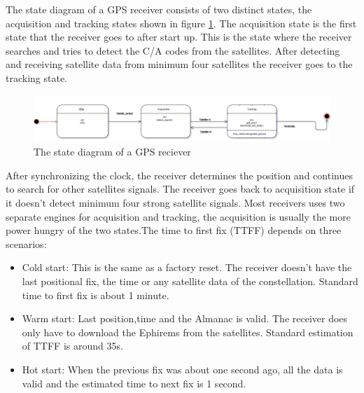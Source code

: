   The state diagram of a GPS receiver consists of two distinct states, the acquisition and tracking states shown in figure \ref{fig:GPS reciever}. The acquisition state is the first state that the receiver goes to after start up. This is the state where the receiver searches and tries to detect the C/A codes from the satellites. After detecting and receiving satellite data from minimum four satellites the receiver goes to the tracking state.
 \begin{figure}[H]
\centering
\includegraphics[width=16 cm]{Project_Report/Images/gps_basics.PNG}
\caption{The state diagram of a GPS reciever}
\label{fig:GPS reciever}
\end{figure}

After synchronizing the clock, the receiver determines the position and continues to search for other satellites signals. The receiver goes back to acquisition state if it doesn't detect minimum four strong satellite signals.
Most receivers uses two separate engines for acquisition and tracking, the acquisition is usually the more power hungry of the two states.The time to first fix (TTFF) depends on three scenarios:
\begin{itemize}
\item Cold start: This is the same as a factory reset. The receiver doesn't have the last positional fix, the time or any satellite data of the constellation. Standard time to first fix  is about 1 minute.
\item Warm start: Last position,time and the Almanac is valid. The receiver does only have to download the Ephirems from the satellites. Standard estimation of TTFF is around 35s.
\item Hot start: When the previous fix was about one second ago, all the data is valid and the estimated time to next fix is 1 second. 

\end{itemize}


\newpage